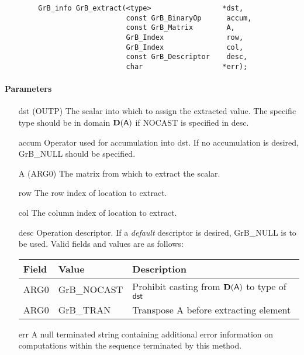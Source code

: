 \begin{verbatim}
        GrB_info GrB_extract(<type>                 *dst,
                             const GrB_BinaryOp      accum,
                             const GrB_Matrix        A,
                             GrB_Index               row,
                             GrB_Index               col,
                             const GrB_Descriptor    desc,
                             char                   *err); 

\end{verbatim}

\paragraph{Parameters}

\begin{itemize}[leftmargin=1in]
    \item[{\sf dst}]   ({\sf OUTP}) The scalar into which to assign the extracted value.  The specific type should be in domain $\bold{D}({\sf A})$ if {\sf NOCAST} is specified in {\sf desc}.
    \item[{\sf accum}] Operator used for accumulation into dst. If no accumulation is desired,
                        {\sf GrB\_NULL} should be specified.
    \item[{\sf A}]   ({\sf ARG0}) The matrix from which to extract the scalar.
    \item[{\sf row}] The row index of location to extract.
    \item[{\sf col}] The column index of location to extract.

    \item[{\sf desc}]   Operation descriptor. If a
    \emph{default} descriptor is desired, {\sf GrB\_NULL} is to be
    used.  Valid fields and values are as follows: \\
    \begin{tabular}{lll}
    Field  & Value & Description \\
    \hline
    {\sf ARG0} & {\sf GrB\_NOCAST} & Prohibit casting from $\bold{D}({\sf A})$ to type of ${\sf dst}$ \\
    {\sf ARG0} & {\sf GrB\_TRAN} &  Transpose {\sf A} before extracting element \\
    \end{tabular}
    \item[{\sf err}]     A null terminated string containing additional error
                         information on computations within the sequence 
                         terminated by this method. 

\end{itemize}

